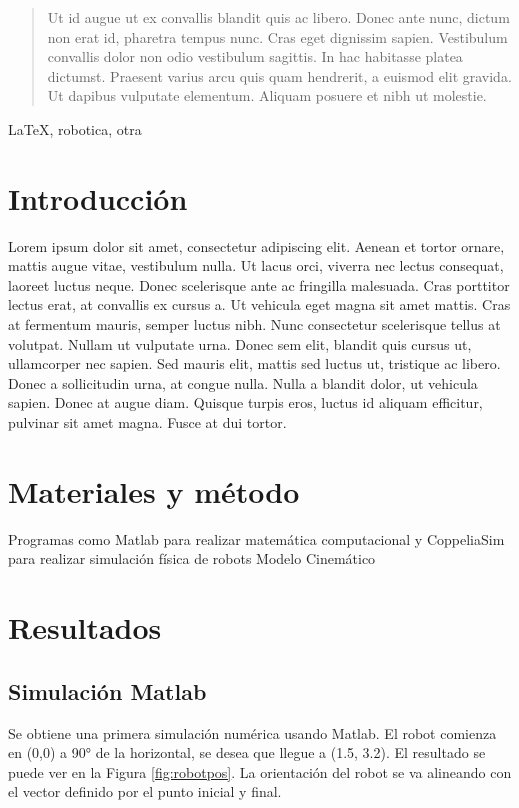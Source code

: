 \documentclass[conference]{IEEEtran}
\begin{document}
  \begin{abstract}
    Ut id augue ut ex convallis blandit quis ac libero. Donec ante nunc, dictum non erat id, pharetra tempus nunc. Cras eget dignissim sapien. Vestibulum convallis dolor non odio vestibulum sagittis. In hac habitasse platea dictumst. Praesent varius arcu quis quam hendrerit, a euismod elit gravida. Ut dapibus vulputate elementum. Aliquam posuere et nibh ut molestie.
  \end{abstract}

  \begin{IEEEkeywords}
    \LaTeX, robotica, otra
  \end{IEEEkeywords}

  \section{Introducción}
  Lorem ipsum dolor sit amet, consectetur adipiscing elit. Aenean et tortor ornare, mattis augue vitae, vestibulum nulla. Ut lacus orci, viverra nec lectus consequat, laoreet luctus neque. Donec scelerisque ante ac fringilla malesuada. Cras porttitor lectus erat, at convallis ex cursus a. Ut vehicula eget magna sit amet mattis. Cras at fermentum mauris, semper luctus nibh. Nunc consectetur scelerisque tellus at volutpat. Nullam ut vulputate urna. Donec sem elit, blandit quis cursus ut, ullamcorper nec sapien. Sed mauris elit, mattis sed luctus ut, tristique ac libero. Donec a sollicitudin urna, at congue nulla. Nulla a blandit dolor, ut vehicula sapien. Donec at augue diam. Quisque turpis eros, luctus id aliquam efficitur, pulvinar sit amet magna. Fusce at dui tortor.
  
  \section{Materiales y método}
  Programas como Matlab para realizar matemática computacional y CoppeliaSim para realizar simulación física de robots
  Modelo Cinemático \cite{tejada}
  
  \section{Resultados}
  \subsection{Simulación Matlab}
  Se obtiene una primera simulación numérica usando Matlab.
  El robot comienza en (0,0) a 90° de la horizontal, se desea que llegue a (1.5, 3.2).
  El resultado se puede ver en la Figura \ref{fig:robotpos}. La orientación del robot
  se va alineando con el vector definido por el punto inicial y final.
\end{document}
